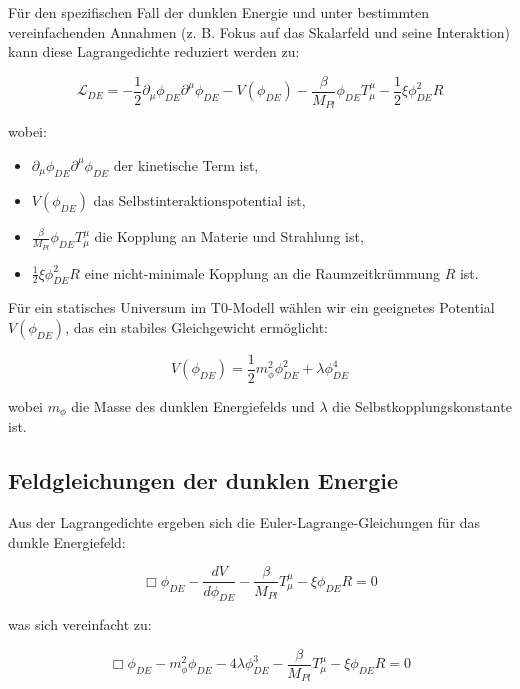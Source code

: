 \documentclass[a4paper,12pt]{article}
\theoremstyle{definition}
\theoremstyle{remark}
\begin{document}
	Für den spezifischen Fall der dunklen Energie und unter bestimmten vereinfachenden Annahmen (z. B. Fokus auf das Skalarfeld und seine Interaktion) kann diese Lagrangedichte reduziert werden zu:
	
	\begin{equation}
		\mathcal{L}_{DE} = -\frac{1}{2}\partial_\mu \phi_{DE} \partial^\mu \phi_{DE} - V(\phi_{DE}) - \frac{\beta}{M_{Pl}} \phi_{DE} T^{\mu}_{\mu} - \frac{1}{2}\xi \phi_{DE}^2 R
	\end{equation}
	
	wobei:
	\begin{itemize}
		\item $\partial_\mu \phi_{DE} \partial^\mu \phi_{DE}$ der kinetische Term ist,
		\item $V(\phi_{DE})$ das Selbstinteraktionspotential ist,
		\item $\frac{\beta}{M_{Pl}} \phi_{DE} T^{\mu}_{\mu}$ die Kopplung an Materie und Strahlung ist,
		\item $\frac{1}{2}\xi \phi_{DE}^2 R$ eine nicht-minimale Kopplung an die Raumzeitkrümmung $R$ ist.
	\end{itemize}
	
	Für ein statisches Universum im T0-Modell wählen wir ein geeignetes Potential $V(\phi_{DE})$, das ein stabiles Gleichgewicht ermöglicht:
	
	\begin{equation}
		V(\phi_{DE}) = \frac{1}{2}m_{\phi}^2\phi_{DE}^2 + \lambda \phi_{DE}^4
	\end{equation}
	
	wobei $m_{\phi}$ die Masse des dunklen Energiefelds und $\lambda$ die Selbstkopplungskonstante ist.
	
	\subsection{Feldgleichungen der dunklen Energie}
	Aus der Lagrangedichte ergeben sich die Euler-Lagrange-Gleichungen für das dunkle Energiefeld:
	
	\begin{equation}
		\Box\phi_{DE} - \frac{dV}{d\phi_{DE}} - \frac{\beta}{M_{Pl}}T^{\mu}_{\mu} - \xi \phi_{DE} R = 0
	\end{equation}
	
	was sich vereinfacht zu:
	
	\begin{equation}
		\Box\phi_{DE} - m_{\phi}^2\phi_{DE} - 4\lambda\phi_{DE}^3 - \frac{\beta}{M_{Pl}}T^{\mu}_{\mu} - \xi \phi_{DE} R = 0
	\end{equation}
	
\end{document}
